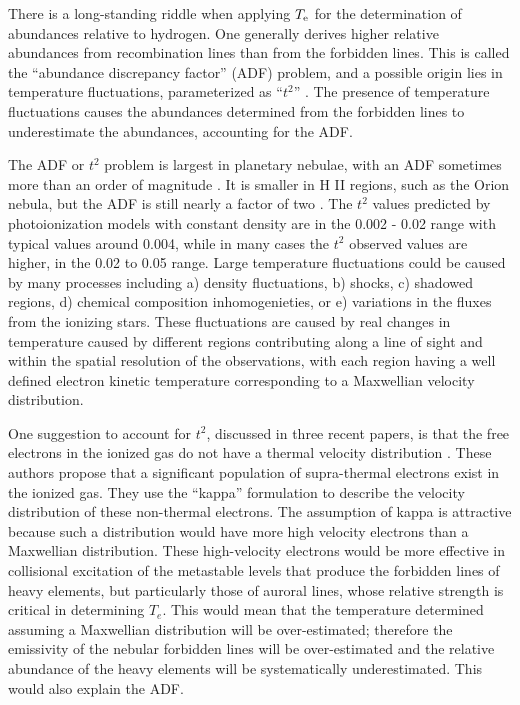 \documentclass[debug, preprint, twocolumn]{rmaa}
\begin{document}
There is a long-standing riddle when applying $T\rm_{e}$ for the determination of  abundances relative to hydrogen.
One generally derives higher relative abundances from recombination lines than from the forbidden 
lines. This is called the ``abundance discrepancy factor'' (ADF) problem,
and a possible origin lies in temperature fluctuations, parameterized as ``$t^2$''  
\citep{Peimbert1967,1993ApJ...414..626P}. 
The presence of temperature fluctuations causes the abundances determined from the
forbidden lines to underestimate the abundances, accounting for the ADF.

The ADF or $t^2$ problem is largest in planetary nebulae, 
with an ADF sometimes more than an order of magnitude
\citep{2000MNRAS.312..585L}.
It is smaller in H II regions, such as the Orion nebula, 
but the ADF is still nearly a factor of two \citep{2013ApJ...778...89P}. 
The $t^2$ values predicted by photoionization models with constant density are in the 
0.002 - 0.02 range with typical values around 0.004,
while in many cases the $t^2$ observed values are higher, in the 0.02 to 0.05 range.
Large temperature fluctuations could be caused by many processes including a) density fluctuations,
b) shocks, c) shadowed regions, d) chemical composition inhomogenieties, 
or e) variations in the fluxes from the ionizing stars.
These fluctuations are caused by real changes in temperature caused by different regions
contributing along a line of sight and within the spatial resolution of the observations, 
with each region having a
well defined electron kinetic temperature corresponding to 
a Maxwellian velocity distribution.

One suggestion to account for $t^2$, discussed in three recent papers, is that the free
electrons in the ionized gas do not have a thermal velocity distribution \citep{KappaNicholls12,KappaNicholls13,KappaDopita13}. 
These authors propose that a significant population of supra-thermal electrons exist in the ionized gas.
They use the ``kappa'' formulation \citep{1968JGR....73.2839V} to describe the velocity distribution of these non-thermal electrons.
The assumption of kappa is attractive because such a distribution would have more high velocity electrons than a Maxwellian distribution. 
These high-velocity electrons would be more effective in collisional excitation of the metastable levels that 
produce the forbidden lines of heavy elements, but particularly those of auroral lines,
whose relative strength is critical in determining $T_e$. 
This would mean that the temperature determined assuming a Maxwellian distribution will be over-estimated; 
therefore the emissivity of the nebular forbidden lines will be over-estimated and the relative abundance of the 
heavy elements will be systematically underestimated. 
This would also explain the ADF. 
\end{document}
